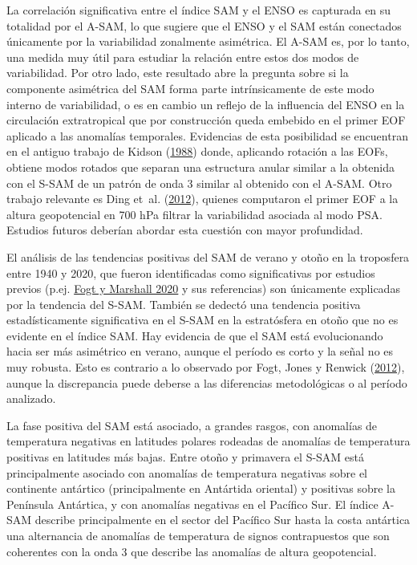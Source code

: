 \documentclass[12pt,oneside,a4paper]{reedthesis}
\begin{document}
La correlación significativa entre el índice SAM y el ENSO es capturada en su totalidad por el A-SAM, lo que sugiere que el ENSO y el SAM están conectados únicamente por la variabilidad zonalmente asimétrica.
El A-SAM es, por lo tanto, una medida muy útil para estudiar la relación entre estos dos modos de variabilidad.
Por otro lado, este resultado abre la pregunta sobre si la componente asimétrica del SAM forma parte intrínsicamente de este modo interno de variabilidad, o es en cambio un reflejo de la influencia del ENSO en la circulación extratropical que por construcción queda embebido en el primer EOF aplicado a las anomalías temporales.
Evidencias de esta posibilidad se encuentran en el antiguo trabajo de Kidson (\protect\hyperlink{ref-kidson1988}{1988}) donde, aplicando rotación a las EOFs, obtiene modos rotados que separan una estructura anular similar a la obtenida con el S-SAM de un patrón de onda 3 similar al obtenido con el A-SAM.
Otro trabajo relevante es Ding et~al. (\protect\hyperlink{ref-ding2012a}{2012}), quienes computaron el primer EOF a la altura geopotencial en 700 hPa filtrar la variabilidad asociada al modo PSA.
Estudios futuros deberían abordar esta cuestión con mayor profundidad.

El análisis de las tendencias positivas del SAM de verano y otoño en la troposfera entre 1940 y 2020, que fueron identificadas como significativas por estudios previos (p.ej. \protect\hyperlink{ref-fogt2020}{Fogt y Marshall 2020} y sus referencias) son únicamente explicadas por la tendencia del S-SAM.
También se dedectó una tendencia positiva estadísticamente significativa en el S-SAM en la estratósfera en otoño que no es evidente en el índice SAM.
Hay evidencia de que el SAM está evolucionando hacia ser más asimétrico en verano, aunque el período es corto y la señal no es muy robusta.
Esto es contrario a lo observado por Fogt, Jones y Renwick (\protect\hyperlink{ref-fogt2012}{2012}), aunque la discrepancia puede deberse a las diferencias metodológicas o al período analizado.

La fase positiva del SAM está asociado, a grandes rasgos, con anomalías de temperatura negativas en latitudes polares rodeadas de anomalías de temperatura positivas en latitudes más bajas.
Entre otoño y primavera el S-SAM está principalmente asociado con anomalías de temperatura negativas sobre el continente antártico (principalmente en Antártida oriental) y positivas sobre la Península Antártica, y con anomalías negativas en el Pacífico Sur.
El índice A-SAM describe principalmente en el sector del Pacífico Sur hasta la costa antártica una alternancia de anomalías de temperatura de signos contrapuestos que son coherentes con la onda 3 que describe las anomalías de altura geopotencial.
\end{document}
